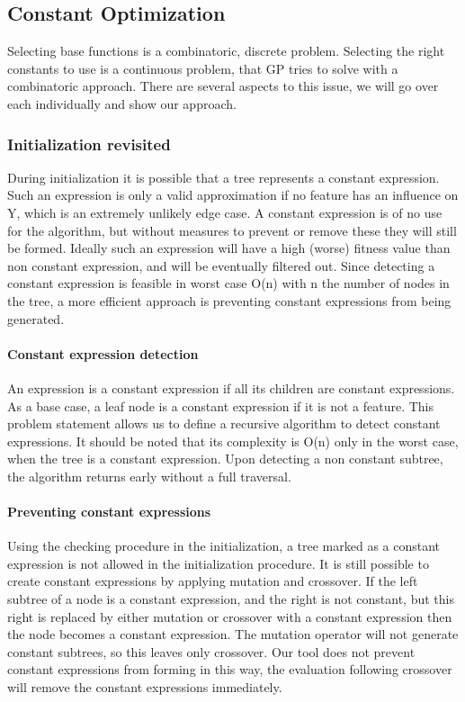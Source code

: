 \subsection{Constant Optimization} \label{subconstantoptimization}
Selecting base functions is a combinatoric, discrete problem. Selecting the right constants to use is a continuous problem, that GP tries to solve with a combinatoric approach. There are several aspects to this issue, we will go over each individually and show our approach.
\subsubsection{Initialization revisited}
During initialization it is possible that a tree represents a constant expression. Such an expression is only a valid approximation if no feature has an influence on Y, which is an extremely unlikely edge case. A constant expression is of no use for the algorithm, but without measures to prevent or remove these they will still be formed. Ideally such an expression will have a high (worse) fitness value than non constant expression, and will be eventually filtered out. Since detecting a constant expression is feasible in worst case O(n) with n the number of nodes in the tree, a more efficient approach is preventing constant expressions from being generated. 
\paragraph{Constant expression detection}
An expression is a constant expression if all its children are constant expressions. As a base case, a leaf node is a constant expression if it is not a feature. This problem statement allows us to define a recursive algorithm to detect constant expressions. It should be noted that its complexity is O(n) only in the worst case, when the tree is a constant expression. Upon detecting a non constant subtree, the algorithm returns early without a full traversal. 
\paragraph{Preventing constant expressions}
Using the checking procedure in the initialization, a tree marked as a constant expression is not allowed in the initialization procedure.
It is still possible to create constant expressions by applying mutation and crossover. If the left subtree of a node is a constant expression, and the right is not constant, but this right is replaced by either mutation or crossover with a constant expression then the node becomes a constant expression. The mutation operator will not generate constant subtrees, so this leaves only crossover. Our tool does not prevent constant expressions from forming in this way, the evaluation following crossover will remove the constant expressions immediately.
